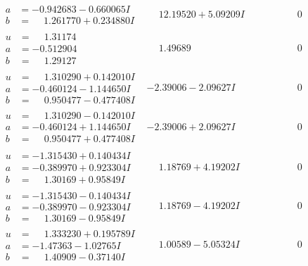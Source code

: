 \documentclass[1p]{elsarticle_modified}
\theoremstyle{definition}
\begin{document}
$$\begin{array}{c|c|c}
\begin{aligned}
a &= -0.942683 - 0.660065 I \\
b &= \phantom{-}1.261770 + 0.234880 I\end{aligned}
 & \phantom{-}12.19520 + 5.09209 I & \phantom{-0.000000 } 0 \\ \hline\begin{aligned}
u &= \phantom{-}1.31174\phantom{ +0.000000I} \\
a &= -0.512904\phantom{ +0.000000I} \\
b &= \phantom{-}1.29127\phantom{ +0.000000I}\end{aligned}
 & \phantom{-}1.49689\phantom{ +0.000000I} & \phantom{-0.000000 } 0 \\ \hline\begin{aligned}
u &= \phantom{-}1.310290 + 0.142010 I \\
a &= -0.460124 - 1.144650 I \\
b &= \phantom{-}0.950477 - 0.477408 I\end{aligned}
 & -2.39006 - 2.09627 I & \phantom{-0.000000 } 0 \\ \hline\begin{aligned}
u &= \phantom{-}1.310290 - 0.142010 I \\
a &= -0.460124 + 1.144650 I \\
b &= \phantom{-}0.950477 + 0.477408 I\end{aligned}
 & -2.39006 + 2.09627 I & \phantom{-0.000000 } 0 \\ \hline\begin{aligned}
u &= -1.315430 + 0.140434 I \\
a &= -0.389970 + 0.923304 I \\
b &= \phantom{-}1.30169 + 0.95849 I\end{aligned}
 & \phantom{-}1.18769 + 4.19202 I & \phantom{-0.000000 } 0 \\ \hline\begin{aligned}
u &= -1.315430 - 0.140434 I \\
a &= -0.389970 - 0.923304 I \\
b &= \phantom{-}1.30169 - 0.95849 I\end{aligned}
 & \phantom{-}1.18769 - 4.19202 I & \phantom{-0.000000 } 0 \\ \hline\begin{aligned}
u &= \phantom{-}1.333230 + 0.195789 I \\
a &= -1.47363 - 1.02765 I \\
b &= \phantom{-}1.40909 - 0.37140 I\end{aligned}
 & \phantom{-}1.00589 - 5.05324 I & \phantom{-0.000000 } 0 \\ \hline\begin{aligned}

\end{aligned}
\end{array}$$
\end{document}
